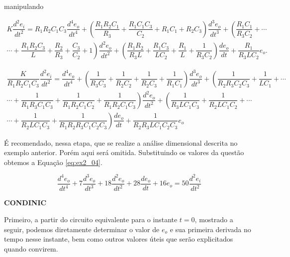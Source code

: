 \documentclass{article}
\numberwithin{equation}{section}
\newcommand{\deo}[1]{\dfrac{d^{#1}e_o}{dt^{#1}}}
\newcommand{\dei}[1]{\dfrac{d^{#1}e_i}{dt^{#1}}}
\let\dfr\dfrac
\begin{document}
\noindent manipulando


\begin{equation*}
    \begin{split}
        K\dei{2} = R_1R_2C_1C_3\deo{4} + \left(\dfr{R_1R_2C_1}{R_3}+\dfr{R_1C_1C_3}{C_2}+R_1C_1+R_2C_3\right)\deo{3}+\left(\dfr{R_1C_1}{R_3C_2}+\right.\cdots\\
        \left.\cdots+\dfr{R_1R_2C_3}{L}+\dfr{R_2}{R_3}+\dfr{C_3}{C_2}+1\right)\deo{2} + \left(\dfr{R_1R_2}{R_3L}+\dfr{R_1C_3}{LC_2}+\dfr{R_1}{L}+\dfr{1}{R_3C_2}\right)\dfr{de_o}{dt}+\dfr{R_1}{R_3LC_2}e_o.
    \end{split}
\end{equation*}


\begin{equation*}
    \begin{split}
        \dfr{K}{R_1R_2C_1C_3}\dei{2} = \deo{4} + \left(\dfr{1}{R_3C_3}+\dfr{1}{R_2C_2}+\dfr{1}{R_2C_3}+\dfr{1}{R_1C_1}\right)\deo{3}+\left(\dfr{1}{R_2R_3C_2C_3}+\dfr{1}{LC_1}+\right.\cdots\\
        \left.\cdots+\dfr{1}{R_1R_3C_1C_3}+        \dfr{1}{R_1R_2C_1C_2}+\dfr{1}{R_1R_2C_1C_3}\right)\deo{2} + \left(\dfr{1}{R_3LC_1C_3}+\dfr{1}{R_2LC_1C_2}+\right.\cdots\\
        \left.\cdots+\dfr{1}{R_2LC_1C_3}+\dfr{1}{R_1R_2R_3C_1C_2C_3}\right)\dfr{de_o}{dt}+\dfr{1}{R_2R_3LC_1C_2C_3}e_o
    \end{split}
\end{equation*}

\noindent É recomendado, nessa etapa, que se realize a análise dimensional descrita no exemplo anterior. Porém aqui será omitida. Substituindo os valores da questão obtemos a Equação \eqref{eq:ex2_04}.

\begin{equation}
    \label{eq:ex2_04}
    \deo{4} + 7\deo{3} + 18\deo{2} + 28\dfr{de_o}{dt} + 16e_o = 50\dei{2}
\end{equation}


\begin{center}
    \textbf{CONDINIC}
\end{center}

\noindent Primeiro, a partir do circuito equivalente para o instante $t=0$, mostrado a seguir, podemos diretamente determinar o valor de $e_o$ e sua primeira derivada no tempo nesse instante, bem como outros valores úteis que serão explicitados quando convirem.
\end{document}
